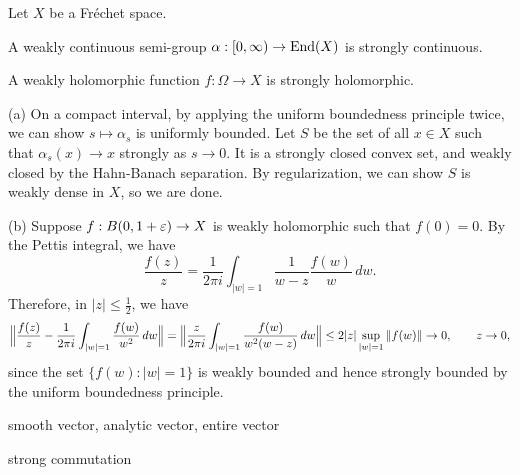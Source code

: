 \documentclass{../../../small}
\begin{document}
\begin{prop}
Let $X$ be a Fr\'echet space.
\begin{parts}
\item A weakly continuous semi-group $\alpha:[0,\infty)\to\operatorname{End}(X)$ is strongly continuous.
\item A weakly holomorphic function $f:\Omega\to X$ is strongly holomorphic.
\end{parts}
\end{prop}
\begin{pf}
(a)
On a compact interval, by applying the uniform boundedness principle twice, we can show $s\mapsto\alpha_s$ is uniformly bounded.
Let $S$ be the set of all $x\in X$ such that $\alpha_s(x)\to x$ strongly as $s\to0$.
It is a strongly closed convex set, and weakly closed by the Hahn-Banach separation.
By regularization, we can show $S$ is weakly dense in $X$, so we are done.

(b)
Suppose $f:B(0,1+\varepsilon)\to X$ is weakly holomorphic such that $f(0)=0$.
By the Pettis integral, we have
\[\frac{f(z)}z=\frac1{2\pi i}\int_{|w|=1}\frac1{w-z}\frac{f(w)}w\,dw.\]
Therefore, in $|z|\le\frac12$, we have
\[\Bigl\|\frac{f(z)}z-\frac1{2\pi i}\int_{|w|=1}\frac{f(w)}{w^2}\,dw\Bigr\|=\Bigl\|\frac z{2\pi i}\int_{|w|=1}\frac{f(w)}{w^2(w-z)}\,dw\Bigr\|\le2|z|\sup_{|w|=1}\|f(w)\|\to0,\qquad z\to0,\]
since the set $\{f(w):|w|=1\}$ is weakly bounded and hence strongly bounded by the uniform boundedness principle.
\end{pf}

\begin{prop}
smooth vector, analytic vector, entire vector
\end{prop}

\begin{prop}
strong commutation
\end{prop}
\end{document}
